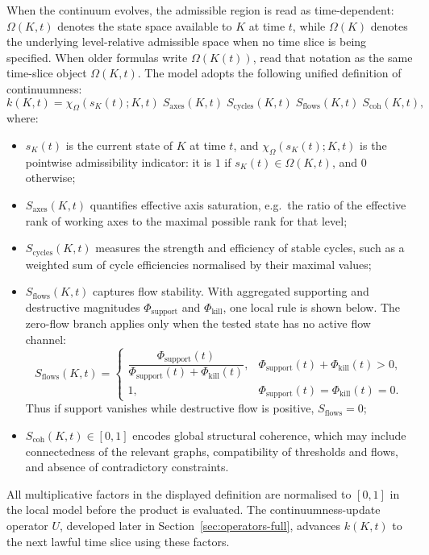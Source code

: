 When the continuum evolves, the admissible region is read as time-dependent:
\(\Omega(K,t)\) denotes the state space available to \(K\) at time \(t\), while
\(\Omega(K)\) denotes the underlying level-relative admissible space when no
time slice is being specified.
When older formulas write \(\Omega(K(t))\), read that notation as the same
time-slice object \(\Omega(K,t)\).
The model adopts the following unified definition of continuumness:
\[
    k(K,t)
    = \chi_{\Omega}(s_K(t);K,t)\;
      S_{\mathrm{axes}}(K,t)\;
      S_{\mathrm{cycles}}(K,t)\;
      S_{\mathrm{flows}}(K,t)\;
      S_{\mathrm{coh}}(K,t),
\]
where:
\begin{itemize}
    \item \(s_K(t)\) is the current state of \(K\) at time \(t\), and
          \(\chi_{\Omega}(s_K(t);K,t)\) is the pointwise admissibility
          indicator:
          it is \(1\) if \(s_K(t)\in\Omega(K,t)\), and \(0\) otherwise;
    \item \(S_{\mathrm{axes}}(K,t)\) quantifies effective axis saturation, e.g.\ the ratio of the effective rank of working axes to the maximal possible rank for that level;
    \item \(S_{\mathrm{cycles}}(K,t)\) measures the strength and efficiency of stable cycles, such as a weighted sum of cycle efficiencies normalised by their maximal values;
    \item \(S_{\mathrm{flows}}(K,t)\) captures flow stability. With aggregated
          supporting and destructive magnitudes
          \(\Phi_{\mathrm{support}}\) and \(\Phi_{\mathrm{kill}}\), one local
          rule is shown below. The zero-flow branch applies only when the
          tested state has no active flow channel:
          \[
              S_{\mathrm{flows}}(K,t)=
              \begin{cases}
              \dfrac{\Phi_{\mathrm{support}}(t)}
                    {\Phi_{\mathrm{support}}(t)+\Phi_{\mathrm{kill}}(t)},
                    & \Phi_{\mathrm{support}}(t)+\Phi_{\mathrm{kill}}(t)>0,\\[0.7em]
              1, & \Phi_{\mathrm{support}}(t)=\Phi_{\mathrm{kill}}(t)=0.
              \end{cases}
          \]
          Thus if support vanishes while destructive flow is positive,
          \(S_{\mathrm{flows}}=0\);
    \item \(S_{\mathrm{coh}}(K,t)\in[0,1]\) encodes global structural
          coherence, which may include connectedness of the relevant graphs,
          compatibility of thresholds and flows, and absence of contradictory
          constraints.
\end{itemize}
All multiplicative factors in the displayed definition are normalised to
\([0,1]\) in the local model before the product is evaluated.
The continuumness-update operator \(U\), developed later in
Section~\ref{sec:operators-full}, advances \(k(K,t)\) to the next lawful time
slice using these factors.

